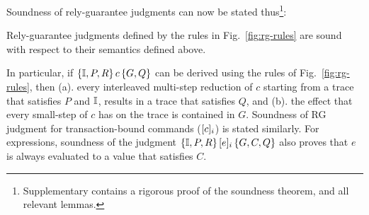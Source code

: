 Soundness of rely-guarantee judgments can now be stated
thus\footnote{Supplementary contains a rigorous proof of the soundness
theorem, and all relevant lemmas.}:
\begin{theorem}[Soundness] 
Rely-guarantee judgments defined by the rules in
Fig.~\ref{fig:rg-rules} are sound with respect to their semantics
defined above. 
\end{theorem}
\noindent In particular, if $\{\mathbb{I},P,R\}\,c\,\{G,Q\}$ can be derived using
the rules of Fig.~\ref{fig:rg-rules}, then (a). every interleaved
multi-step reduction of $c$ starting from a trace that satisfies $P$
and $\mathbb{I}$, results in a trace that satisfies $Q$, and (b). the effect
that every small-step of $c$ has on the trace is contained in $G$.
Soundness of RG judgment for transaction-bound commands
($\lbrack c \rbrack_i$) is stated similarly.  For expressions, soundness of
the judgment $\{\mathbb{I},P,R\}\,\lbrack e \rbrack_i\,\{G,C,Q\}$ also proves that $e$
is always evaluated to a value that satisfies $C$.

